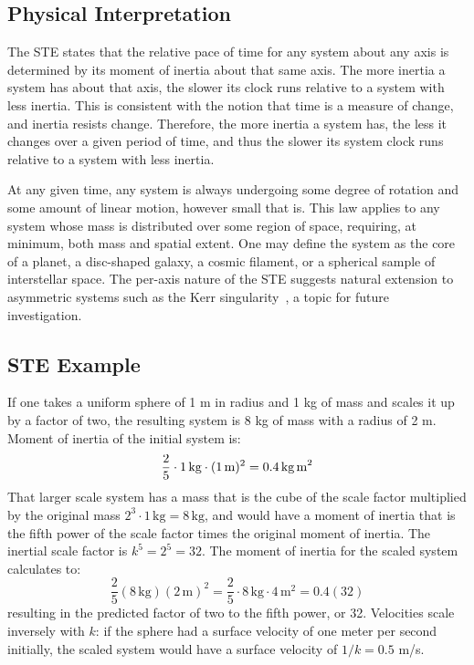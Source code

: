 \documentclass[a4paper,11pt]{article}
\begin{document}
\subsection{Physical Interpretation}
The STE states that the relative pace of time for any system about any axis is determined by its moment of inertia about that same axis. The more inertia a system has about that axis, the slower its clock runs relative to a system with less inertia. This is consistent with the notion that time is a measure of change, and inertia resists change. Therefore, the more inertia a system has, the less it changes over a given period of time, and thus the slower its system clock runs relative to a system with less inertia.

At any given time, any system is always undergoing some degree of rotation and some amount of linear motion, however small that is. This law applies to any system whose mass is distributed over some region of space, requiring, at minimum, both mass and spatial extent. One may define the system as the core of a planet, a disc-shaped galaxy, a cosmic filament, or a spherical sample of interstellar space. The per-axis nature of the STE suggests natural extension to asymmetric systems such as the Kerr singularity~\cite{kerr1963}, a topic for future investigation.

\subsection{STE Example}
If one takes a uniform sphere of 1 m in radius and 1 kg of mass and scales it up by a factor of two, the resulting system is 8 kg of mass with a radius of 2 m. Moment of inertia of the initial system is:
\[
\frac{2}{5} \cdot 1\,\text{kg} \cdot (1\,\text{m})^2 = 0.4\,\text{kg\,m}^2
\]
That larger scale system has a mass that is the cube of the scale factor multiplied by the original mass $2^3 \cdot 1\,\text{kg} = 8\,\text{kg}$, and would have a moment of inertia that is the fifth power of the scale factor times the original moment of inertia. The inertial scale factor is $k^5 = 2^5 = 32$. The moment of inertia for the scaled system calculates to:
\[
\frac{2}{5}(8\,\text{kg})(2\,\text{m})^2 = \frac{2}{5} \cdot 8\,\text{kg} \cdot 4\,\text{m}^2 = 0.4(32)
\]
resulting in the predicted factor of two to the fifth power, or 32. Velocities scale inversely with $k$: if the sphere had a surface velocity of one meter per second initially, the scaled system would have a surface velocity of $1/k = 0.5$ m/s.
\end{document}
